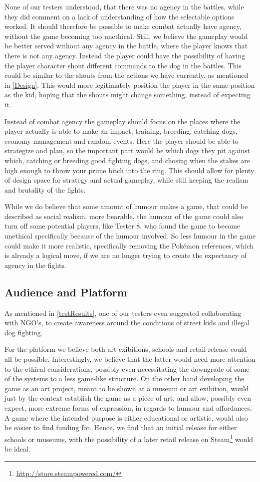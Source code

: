 None of our testers understood, that there was no agency in the battles, while they did comment on a lack of understanding of how the selectable options worked. It should therefore be possible to make combat actually have agency, without the game becoming too unethical. Still, we believe the gameplay would be better served without any agency in the battle, where the player knows that there is not any agency. Instead the player could have the possibility of having the player character shout different commands to the dog in the battles. This could be similar to the shouts from the actions we have currently, as mentioned in \ref{Design}. This would more legitimately position the player in the same position as the kid, hoping that the shouts might change something, instead of expecting it.\

Instead of combat agency the gameplay should focus on the places where the player actually is able to make an impact; training, breeding, catching dogs, economy management and random events. Here the player should be able to strategize and plan, so the important part would be which dogs they pit against which, catching or breeding good fighting dogs, and chosing when the stakes are high enough to throw your prime bitch into the ring. This should allow for plenty of design space for strategy and actual gameplay, while still keeping the realism and brutality of the fights. \

While we do believe that some amount of humour makes a game, that could be described as social realism, more bearable, the humour of the game could also turn off some potential players, like Tester 8, who found the game to become unethical specifically because of the humour involved. So less humour in the game could make it more realistic, specifically removing the Pokémon references, which is already a logical move, if we are no longer trying to create the expectancy of agency in the fights.\

\subsection{Audience and Platform}

As mentioned in \ref{testResults}, one of our testers even suggested collaborating with NGO's, to create awareness around the conditions of street kids and illegal dog fighting. \

For the platform we believe both art exibitions, schools and retail release could all be possible. Interestingly, we believe that the latter would need more attention to the ethical considerations, possibly even necessitating the downgrade of some of the systems to a less game-like structure. On the other hand developing the game as an art project, meant to be shown at a museum or art exibition, would just by the context establish the game as a piece of art, and allow, possibly even expect, more extreme forms of expression, in regards to humour and affordances.
A game where the intended purpose is either educational or artistic, would also be easier to find funding for. 
Hence, we find that an initial release for either schools or museums, with the possibility of a later retail release on Steam\footnote{\url{http://store.steampowered.com/}} would be ideal.\

